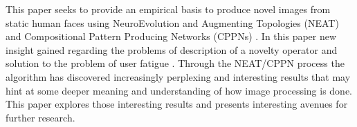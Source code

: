 This paper seeks to provide an empirical basis to produce novel images from static human faces
using NeuroEvolution and Augmenting Topologies (NEAT) \cite{stanley2002evolving} and Compositional Pattern Producing
Networks (CPPNs) \cite{stanley2007compositional}. In this paper new insight gained regarding the problems of description
of a novelty operator \cite{lehman2010efficiently} and solution to the problem of user fatigue \cite{secretan2008picbreeder}.
Through the NEAT/CPPN process the algorithm has discovered increasingly perplexing and interesting results that may hint
at some deeper meaning and understanding of how image processing is done. This paper explores those interesting results
and presents interesting avenues for further research. 